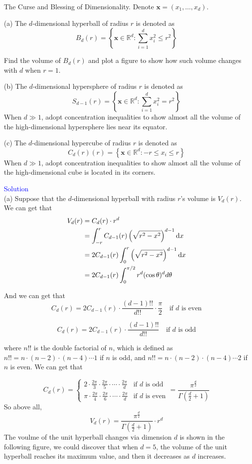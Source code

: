 \begin{homeworkProblem}

The Curse and Blessing of Dimensionality. Denote $\boldsymbol{x}=\left(x_1, \ldots, x_d\right)$.

(a) The $d$-dimensional hyperball of radius $r$ is denoted as
$$B_d(r)=\left\{\boldsymbol{x} \in \mathbb{R}^d: \sum_{i=1}^d x_i^2 \leq r^2\right\}$$

Find the volume of $B_d(r)$ and plot a figure to show how such volume changes with $d$ when $r=1$.

(b) The $d$-dimensional hypersphere of radius $r$ is denoted as
$$S_{d-1}(r)=\left\{\boldsymbol{x} \in \mathbb{R}^d: \sum_{i=1}^d x_i^2=r^2\right\}$$
When $d \gg 1$, adopt concentration inequalities to show almost all the volume of the high-dimensional hypersphere lies near its equator.

(c) The $d$-dimensional hypercube of radius $r$ is denoted as
$$C_d(r)(r)=\left\{\boldsymbol{x} \in \mathbb{R}^d:-r \leq x_i \leq r\right\}$$
When $d \gg 1$, adopt concentration inequalities to show almost all the volume of the high-dimensional cube is located in its corners.

\textcolor{blue}{Solution} \\

(a) Suppose that the $d$-dimensional hyperball with radius $r$'s volume is $V_d(r)$. We can get that
\begin{align*}
V_d(r) &= C_d(r) \cdot r^d \\
&= \int_{-r}^r C_{d-1}(r) \left(\sqrt{r^2 - x^2}\right)^{d-1} \mathrm{d}x \\
&= 2C_{d-1}(r) \int_0^r \left(\sqrt{r^2 - x^2}\right)^{d-1} \mathrm{d}x \\
&= 2 C_{d-1}(r) \int_0^{\pi / 2} r^d (\cos\theta)^{d} d\theta
\end{align*}

And we can get that
$$
C_d(r) = 2 C_{d-1}(r) \cdot \frac{(d-1)!!}{d!!} \cdot \frac{\pi}{2} \quad \text{if } d \text{ is even}
$$

$$
C_d(r) = 2 C_{d-1}(r) \cdot \frac{(d-1)!!}{d!!} \quad \text{if } d \text{ is odd}
$$

where $n!!$ is the double factorial of $n$, which is defined as $n!! = n \cdot (n-2) \cdot (n-4) \cdots 1$ if $n$ is odd, and $n!! = n \cdot (n-2) \cdot (n-4) \cdots 2$ if $n$ is even. We can get that

$$
C_d(r) = 
\begin{cases}
2 \cdot \frac{2 \pi}{3} \cdot \frac{2 \pi}{5} \cdot \cdots \cdot \frac{2 \pi}{d} & \text{if } d \text{ is odd} \\
\pi \cdot \frac{2 \pi}{4} \cdot \frac{2 \pi}{6} \cdot \cdots \cdot \frac{2 \pi}{d} & \text{if } d \text{ is even}
\end{cases}
= \frac{\pi^{\frac{d}{2}}}{\Gamma\left(\frac{d}{2} + 1\right)}
$$
So above all,
$$
V_d(r) = \frac{\pi^{\frac{d}{2}}}{\Gamma\left(\frac{d}{2} + 1\right)} \cdot r^d
$$
The voulme of the unit hyperball changes via dimension $d$ is shown in the following figure, we could discover that when $d=5$, the volume of the unit hyperball reaches its maximum value, and then it decreases as $d$ increases.


\end{homeworkProblem}

